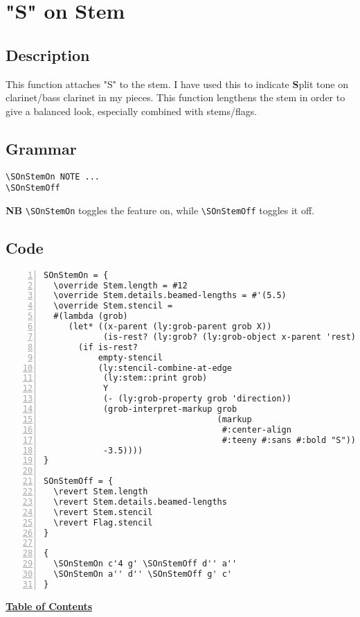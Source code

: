 \vfill \break



\section {"S" on Stem}
\hfill

\subsection{Description}
This function attaches "S" to the stem. I have used this to indicate \textbf{S}plit tone on clarinet/bass clarinet in my pieces. This function lengthens the stem in order to give a balanced look, especially combined with stems/flags. 
\subsection{Grammar}
\begin{verbatim}
\SOnStemOn NOTE ...
\SOnStemOff
\end{verbatim}
\textbf{NB} \verb|\SOnStemOn| toggles the feature on, while \verb|\SOnStemOff| toggles it off.

\subsection{Code}
\begin{Verbatim}[numbers=left,xleftmargin=5mm]
SOnStemOn = {
  \override Stem.length = #12
  \override Stem.details.beamed-lengths = #'(5.5)
  \override Stem.stencil =
  #(lambda (grob)
     (let* ((x-parent (ly:grob-parent grob X))
            (is-rest? (ly:grob? (ly:grob-object x-parent 'rest))))
       (if is-rest?
           empty-stencil
           (ly:stencil-combine-at-edge
            (ly:stem::print grob)
            Y
            (- (ly:grob-property grob 'direction))
            (grob-interpret-markup grob
                                   (markup
                                    #:center-align
                                    #:teeny #:sans #:bold "S"))
            -3.5))))
}

SOnStemOff = {
  \revert Stem.length
  \revert Stem.details.beamed-lengths
  \revert Stem.stencil
  \revert Flag.stencil
}

{
  \SOnStemOn c'4 g' \SOnStemOff d'' a''
  \SOnStemOn a'' d'' \SOnStemOff g' c'
}
\end{Verbatim}
\hyperref[sec:toc]{\textbf{Table of Contents}}

